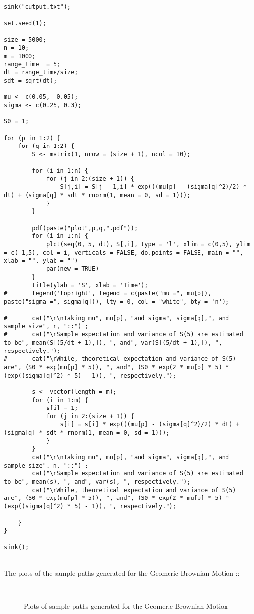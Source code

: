 \documentclass[11pt]{article}
\begin{document}
\begin{lstlisting}
sink("output.txt");

set.seed(1);

size = 5000;
n = 10;
m = 1000;
range_time  = 5;
dt = range_time/size;
sdt = sqrt(dt);

mu <- c(0.05, -0.05);
sigma <- c(0.25, 0.3);

S0 = 1;

for (p in 1:2) {
	for (q in 1:2) {
		S <- matrix(1, nrow = (size + 1), ncol = 10);

		for (i in 1:n) {
			for (j in 2:(size + 1)) {
				S[j,i] = S[j - 1,i] * exp(((mu[p] - (sigma[q]^2)/2) * dt) + (sigma[q] * sdt * rnorm(1, mean = 0, sd = 1)));
			}
		}

		pdf(paste("plot",p,q,".pdf"));
		for (i in 1:n) {
			plot(seq(0, 5, dt), S[,i], type = 'l', xlim = c(0,5), ylim = c(-1,5), col = i, verticals = FALSE, do.points = FALSE, main = "", xlab = "", ylab = "")
			par(new = TRUE)
		}
		title(ylab = 'S', xlab = 'Time');
#		legend('topright', legend = c(paste("mu =", mu[p]), paste("sigma =", sigma[q])), lty = 0, col = "white", bty = 'n');

#		cat("\n\nTaking mu", mu[p], "and sigma", sigma[q],", and sample size", n, "::") ;
#		cat("\nSample expectation and variance of S(5) are estimated to be", mean(S[(5/dt + 1),]), ", and", var(S[(5/dt + 1),]), ", respectively.");
#		cat("\nWhile, theoretical expectation and variance of S(5) are", (S0 * exp(mu[p] * 5)), ", and", (S0 * exp(2 * mu[p] * 5) * (exp((sigma[q]^2) * 5) - 1)), ", respectively.");

		s <- vector(length = m);
		for (i in 1:m) {
			s[i] = 1;
			for (j in 2:(size + 1)) {
				s[i] = s[i] * exp(((mu[p] - (sigma[q]^2)/2) * dt) + (sigma[q] * sdt * rnorm(1, mean = 0, sd = 1)));
			}	
		}
		cat("\n\nTaking mu", mu[p], "and sigma", sigma[q],", and sample size", m, "::") ;
		cat("\nSample expectation and variance of S(5) are estimated to be", mean(s), ", and", var(s), ", respectively.");
		cat("\nWhile, theoretical expectation and variance of S(5) are", (S0 * exp(mu[p] * 5)), ", and", (S0 * exp(2 * mu[p] * 5) * (exp((sigma[q]^2) * 5) - 1)), ", respectively.");

	}
}

sink();
\end{lstlisting}
\newpage
{}\\
The plots of the sample paths generated for the Geomeric Brownian Motion ::
\begin{figure}[H]
	\centering
	\\
		\caption{Plots of sample paths generated for the Geomeric Brownian Motion}	
\end{figure}
\end{document}
